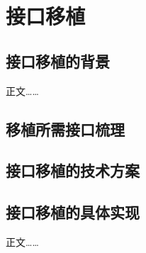 
\chapter{接口移植}

\section{接口移植的背景}
正文……\cite{yuFeiJiZongTiDuoXueKeSheJiYouHuaDeXianZhuangYuFaZhanFangXiang2008}

\section{移植所需接口梳理}

\section{接口移植的技术方案}

\section{接口移植的具体实现}

正文……\cite{Hajela2012Application}

